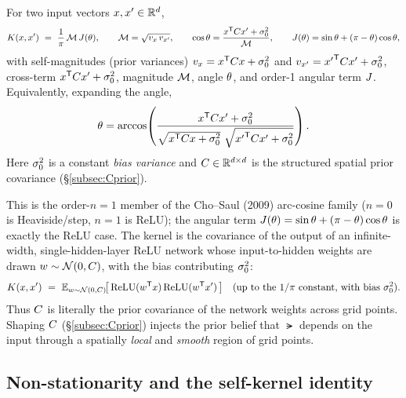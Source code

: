 \begin{definition}
For two input vectors $x,x'\in\mathbb{R}^{d}$,
\begin{equation}
K(x,x')\ =\ \frac{1}{\pi}\,\mathcal{M}\,J(\theta),
\qquad
\mathcal{M}=\sqrt{v_x\,v_{x'}},
\qquad
\cos\theta=\frac{x^{\mathsf{T}}C x'+\sigma_{0}^2}{\mathcal{M}},
\qquad
J(\theta)=\sin\theta+(\pi-\theta)\cos\theta,
\label{eq:acoskernel}
\end{equation}
with self-magnitudes (prior variances) $v_x=x^{\mathsf{T}}C x+\sigma_{0}^2$ and
$v_{x'}={x'}^{\mathsf{T}}C x'+\sigma_{0}^2$, cross-term
$x^{\mathsf{T}}C x'+\sigma_{0}^2$, magnitude $\mathcal{M}$, angle $\theta$, and order-1
angular term $J$. Equivalently, expanding the angle,
\begin{equation}
\theta=\arccos\!\left(
\frac{x^{\mathsf{T}}C x'+\sigma_{0}^2}
     {\sqrt{x^{\mathsf{T}}C x+\sigma_{0}^2}\ \sqrt{{x'}^{\mathsf{T}}C x'+\sigma_{0}^2}}
\right).
\end{equation}
Here $\sigma_{0}^2$ is a constant \emph{bias variance} and $C\in\mathbb{R}^{d\times d}$
is the structured spatial prior covariance (\S\ref{subsec:Cprior}).
\end{definition}

\begin{remark}
This is the order-$n=1$ member of the Cho--Saul (2009) arc-cosine family
($n=0$ is Heaviside/step, $n=1$ is ReLU); the angular term
$J(\theta)=\sin\theta+(\pi-\theta)\cos\theta$ is exactly the ReLU case. The kernel
is the covariance of the output of an infinite-width, single-hidden-layer ReLU
network whose input-to-hidden weights are drawn $w\sim\mathcal{N}(0,C)$, with the
bias contributing $\sigma_{0}^2$:
\begin{equation}
\Kf(x,x')\ =\ \E_{w\sim\Gauss(0,\Cmat)}\!\big[\,\mathrm{ReLU}(w\transpose x)\,\mathrm{ReLU}(w\transpose x')\,\big]
\quad\text{(up to the $1/\pi$ constant, with bias $\sigz^2$).}
\end{equation}
Thus $C$ is literally the prior covariance of the network weights across grid
points. Shaping $C$ (\S\ref{subsec:Cprior}) injects the prior belief that
$\lat$ depends on the input through a spatially \emph{local} and \emph{smooth}
region of grid points.
\end{remark}

\subsection{Non-stationarity and the self-kernel identity}
\label{subsec:selfkernel}


